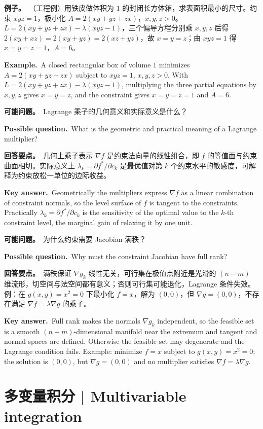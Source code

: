 \documentclass[UTF8,11pt,a4paper]{ctexart}
\newcommand{\EX}[2]{\par\noindent\textbf{例子。}\ #1\par\noindent\textbf{Example.}\ #2\par}
\newcommand{\ASK}[4]{\begin{samepage}\par\noindent\textbf{可能问题。}\ #1\par\noindent\textbf{Possible question.}\ #2\par\noindent\textbf{回答要点。}\ #3\par\noindent\textbf{Key answer.}\ #4\medskip\end{samepage}}
\begin{document}
\EX{（工程例）用铁皮做体积为 $1$ 的封闭长方体箱，求表面积最小的尺寸。约束 $xyz=1$，极小化 $A=2(xy+yz+zx)$，$x,y,z>0$。$L=2(xy+yz+zx)-\lambda(xyz-1)$，三个偏导方程分别乘 $x,y,z$ 后得 $2(xy+xz)=2(xy+yz)=2(xz+yz)$，故 $x=y=z$；由 $xyz=1$ 得 $x=y=z=1$，$A=6$。}{A closed rectangular box of volume $1$ minimizes $A=2(xy+yz+zx)$ subject to $xyz=1$, $x,y,z>0$. With $L=2(xy+yz+zx)-\lambda(xyz-1)$, multiplying the three partial equations by $x,y,z$ gives $x=y=z$, and the constraint gives $x=y=z=1$ and $A=6$.}
\ASK{Lagrange 乘子的几何意义和实际意义是什么？}{What is the geometric and practical meaning of a Lagrange multiplier?}{几何上乘子表示 $\nabla f$ 是约束法向量的线性组合，即 $f$ 的等值面与约束曲面相切。实际意义上 $\lambda_k=\partial f^*/\partial c_k$ 是最优值对第 $k$ 个约束水平的敏感度，可解释为约束放松一单位的边际收益。}{Geometrically the multipliers express $\nabla f$ as a linear combination of constraint normals, so the level surface of $f$ is tangent to the constraints. Practically $\lambda_k=\partial f^*/\partial c_k$ is the sensitivity of the optimal value to the $k$-th constraint level, the marginal gain of relaxing it by one unit.}
\ASK{为什么约束需要 Jacobian 满秩？}{Why must the constraint Jacobian have full rank?}{满秩保证 $\nabla g_k$ 线性无关，可行集在极值点附近是光滑的 $(n-m)$ 维流形，切空间与法空间都有意义；否则可行集可能退化，Lagrange 条件失效。例：在 $g(x,y)=x^2=0$ 下最小化 $f=x$，解为 $(0,0)$，但 $\nabla g=(0,0)$，不存在满足 $\nabla f=\lambda\nabla g$ 的乘子。}{Full rank makes the normals $\nabla g_k$ independent, so the feasible set is a smooth $(n-m)$-dimensional manifold near the extremum and tangent and normal spaces are defined. Otherwise the feasible set may degenerate and the Lagrange condition fails. Example: minimize $f=x$ subject to $g(x,y)=x^2=0$; the solution is $(0,0)$, but $\nabla g=(0,0)$ and no multiplier satisfies $\nabla f=\lambda\nabla g$.}

\section{多变量积分 | Multivariable integration}
\end{document}
